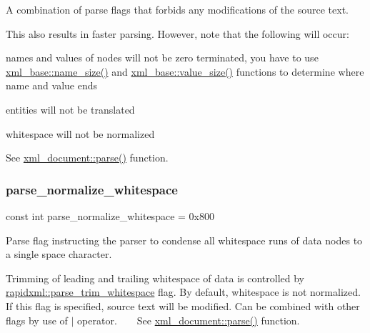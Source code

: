 A combination of parse flags that forbids any modifications of the source text. 

This also results in faster parsing. However, note that the following will occur\+: 
\begin{DoxyItemize}
\item names and values of nodes will not be zero terminated, you have to use \mbox{\hyperlink{classrapidxml_1_1xml__base_ad01e2eff02202b130baad012d1ed7328}{xml\+\_\+base\+::name\+\_\+size()}} and \mbox{\hyperlink{classrapidxml_1_1xml__base_aa6981b3244607ea4ae7634f74f25361b}{xml\+\_\+base\+::value\+\_\+size()}} functions to determine where name and value ends 
\item entities will not be translated 
\item whitespace will not be normalized 
\end{DoxyItemize}See \mbox{\hyperlink{classrapidxml_1_1xml__document_aa280fd704731128b4556b41c1e9182b8}{xml\+\_\+document\+::parse()}} function. \mbox{\label{namespacerapidxml_a88f95d4e275ba01408fefde83078651b}} 
\subsubsection{\texorpdfstring{parse\+\_\+normalize\+\_\+whitespace}{parse\_normalize\_whitespace}}
{\footnotesize\ttfamily const int parse\+\_\+normalize\+\_\+whitespace = 0x800}



Parse flag instructing the parser to condense all whitespace runs of data nodes to a single space character. 

Trimming of leading and trailing whitespace of data is controlled by \mbox{\hyperlink{namespacerapidxml_aac1f06b1afd47b812732fb521b146fd9}{rapidxml\+::parse\+\_\+trim\+\_\+whitespace}} flag. By default, whitespace is not normalized. If this flag is specified, source text will be modified. Can be combined with other flags by use of $\vert$ operator. ~\newline
~\newline
 See \mbox{\hyperlink{classrapidxml_1_1xml__document_aa280fd704731128b4556b41c1e9182b8}{xml\+\_\+document\+::parse()}} function. \mbox{\label{namespacerapidxml_a1c20b2b2b75711cd76423e119c49f830}} 
